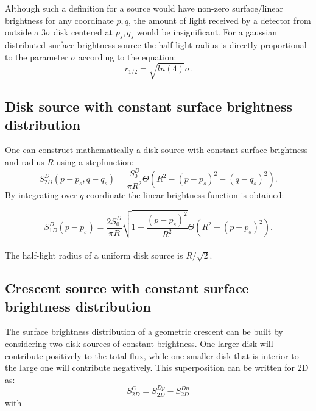 Although such a definition for a source would have non-zero surface/linear brightness for any coordinate $p,q$, the amount of light received by a detector from outside a $3 \sigma$ disk centered at $p_s, q_s$ 
would be insignificant. For a gaussian distributed surface brightness source the half-light radius is directly proportional to the parameter $\sigma$ according to the equation:
\begin{equation}
r_{1/2} = \sqrt{ln(4)} \sigma.
\end{equation}

\subsection{Disk source with constant surface brightness distribution}

One can construct mathematically a disk source with constant surface brightness and radius $R$ using a stepfunction:
\begin{equation}
 S_{2D}^D(p-p_s, q-q_s) = \frac{S_0^D}{\pi R^2} \Theta \left( R^2 - \left( p-p_s \right)^2 - \left( q-q_s \right)^2 \right).
\end{equation}
By integrating over $q$ coordinate the linear brightness function is obtained:


\begin{equation}
 S_{1D}^D(p-p_s) = \frac{2 S_0^D}{\pi R}  \sqrt{1 - \frac{(p-p_s)^2}{R^2} }    \Theta \left( R^2 - \left( p-p_s \right)^2 \right).
\end{equation}
\\
The half-light radius of a uniform disk source is $R/\sqrt{2}$.

\subsection{Crescent source with constant surface brightness distribution}\label{subsec:crescent}

The surface brightness distribution of a geometric crescent can be built by considering two disk sources of constant brightness. One larger disk will contribute positively to the total flux, while one smaller disk 
that is interior to the large one will contribute negatively. This superposition can be written for 2D as:\\

\begin{equation}
 S_{2D}^C =  S_{2D}^{Dp} -  S_{2D}^{Dn}  
 \label{eqn:s2d}
\end{equation}
with\\

